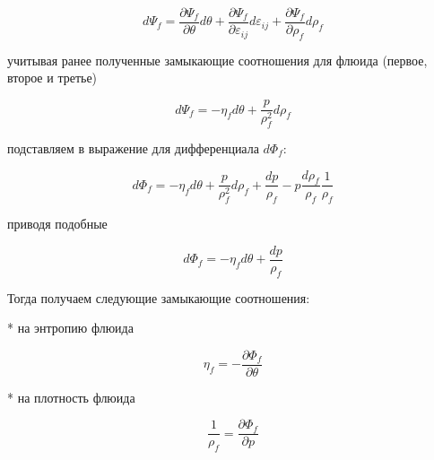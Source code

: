 \documentclass[main.tex]{subfiles}
\begin{document}
$$d\Psi_f=\frac{\partial\Psi_f}{\partial\theta}d\theta+\frac{\partial\Psi_f}{\partial\varepsilon_{ij}}d\varepsilon_{ij}+\frac{\partial\Psi_f}{\partial\rho_f}d\rho_f$$

учитывая ранее полученные замыкающие соотношения для флюида (первое, второе и третье)

$$d\Psi_f=-\eta_f d\theta+\frac{p}{\rho_f^2}d\rho_f$$

подставляем в выражение для дифференциала $d\Phi_f$:

$$d\Phi_f=-\eta_f d\theta+\frac{p}{\rho_f^2}d\rho_f+\frac{dp}{\rho_f}-p\frac{d\rho_f}{\rho_f}\frac{1}{\rho_f}$$

приводя подобные

$$d\Phi_f=-\eta_f d\theta+\frac{dp}{\rho_f}$$

Тогда получаем следующие замыкающие соотношения:

* на энтропию флюида

$$\eta_f=-\frac{\partial\Phi_f}{\partial\theta}$$

* на плотность флюида

$$\frac{1}{\rho_f}=\frac{\partial\Phi_f}{\partial p}$$
\end{document}
